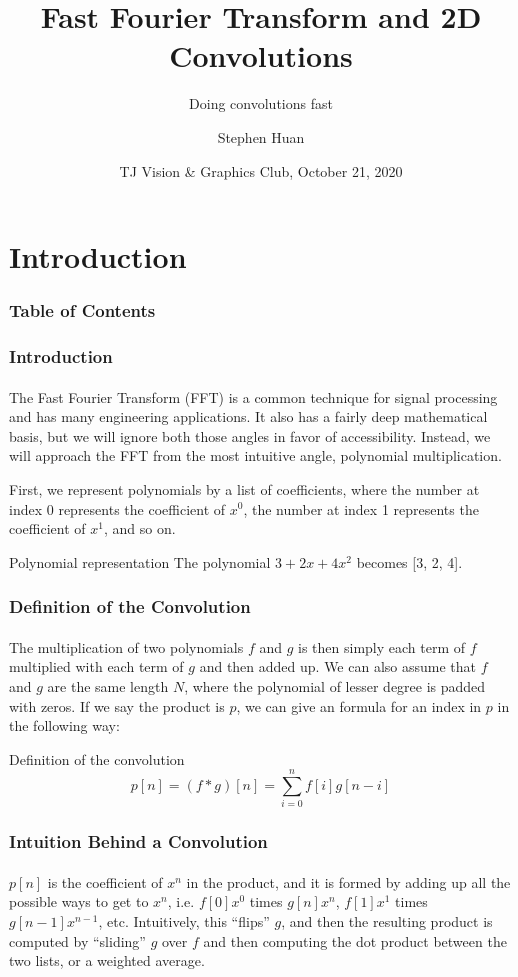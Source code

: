 \documentclass{beamer}                             %
\title[FFT]{Fast Fourier Transform and 2D Convolutions}
\subtitle{Doing convolutions fast}
\author[Huan]{Stephen Huan\inst{1}}
\institute[TJHSST]
{
  \inst{1}
  Thomas Jefferson High School for Science and Technology
}
\date[]{TJ Vision \& Graphics Club, October 21, 2020}
\begin{document}
\frame{\titlepage}

\section{Introduction}
\begin{frame}
\frametitle{Table of Contents}
\tableofcontents[currentsection]
\end{frame}

\begin{frame}
\frametitle{Introduction}
\framesubtitle{}
The Fast Fourier Transform (FFT) is a common technique for signal processing
and has many engineering applications. It also has a fairly deep mathematical
basis, but we will ignore both those angles in favor of accessibility.
Instead, we will approach the FFT from the most intuitive angle,
\alert{polynomial multiplication}. \pause

First, we represent polynomials by a list of coefficients,
where the number at index 0 represents the coefficient of \( x^0 \),
the number at index 1 represents the coefficient of \( x^1 \), and so on.
\begin{exampleblock}{Polynomial representation}
  The polynomial \( 3 + 2x + 4x^2 \) becomes [3, 2, 4].
\end{exampleblock}
\end{frame}

\begin{frame}
\frametitle{Definition of the Convolution}
\framesubtitle{}
The multiplication of two polynomials \( f \) and \( g \) is then simply
each term of \( f \) multiplied with each term of \( g \) and then added up.
We can also assume that \( f \) and \( g \) are the same length \( N \),
where the polynomial of lesser degree is padded with zeros.
If we say the product is \( p \), we can give an formula
for an index in \( p \) in the following way:
\begin{alertblock}{Definition of the convolution}
  \[ p[n] = (f * g)[n] = \sum^n_{i = 0} f[i]g[n - i] \]
\end{alertblock}
\end{frame}

\begin{frame}
\frametitle{Intuition Behind a Convolution}
\framesubtitle{}
\( p[n] \) is the coefficient of \( x^n \) in the product, and it is formed
by adding up all the possible ways to get to \( x^n \), i.e. \( f[0] x^0 \)
times \( g[n] x^n \), \( f[1] x^1 \) times \( g[n - 1] x^{n - 1} \), etc.
Intuitively, this \enquote{flips} \( g \), and then the resulting product
is computed by \enquote{sliding} \( g \) over \( f \) and then computing
the dot product between the two lists, or a weighted average.
\end{frame}
\end{document}
